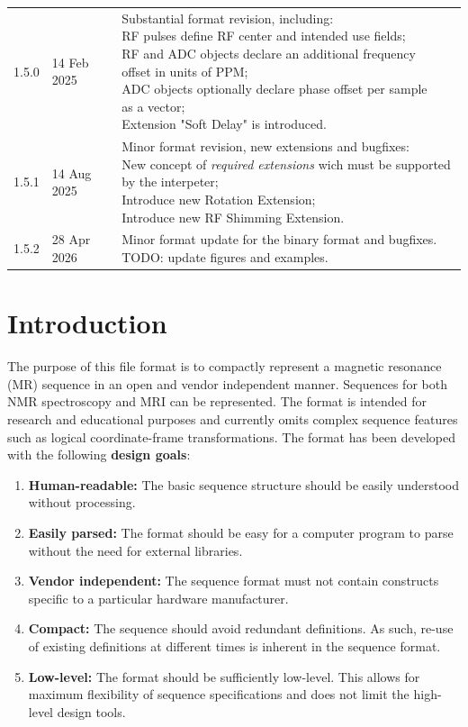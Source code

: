 \documentclass{article}
\begin{document}
\begin{tabular}{lll}
1.5.0 & 14 Feb 2025 & \makecell{Substantial format revision, including: \\
RF pulses define RF center and intended use fields; \\
RF and ADC objects declare an additional frequency \\ offset in units of PPM; \\
ADC objects optionally declare phase offset per sample \\ as a vector; \\
Extension "Soft Delay" is introduced. \\
} \\
1.5.1 & 14 Aug 2025 & \makecell{Minor format revision, new extensions and bugfixes: \\
New concept of \textit{required extensions} wich must be supported by the interpeter; \\
Introduce new Rotation Extension; \\
Introduce new RF Shimming Extension. \\
} \\ 
1.5.2 & 28 Apr 2026 & \makecell{Minor format update for the binary format and bugfixes. \\
TODO: update figures and examples.  \\
} \\ 
\bottomrule
\end{tabular}


\section{Introduction}
The purpose of this file format is to compactly represent a magnetic resonance (MR) sequence in an open and vendor independent manner. Sequences for both NMR spectroscopy and MRI can be represented. The format is intended for research and educational purposes and currently omits complex sequence features such as logical coordinate-frame transformations. The format has been developed with the following \textbf{design goals}:
\begin{enumerate}
\item \textbf{Human-readable:} The basic sequence structure should be easily understood without processing.
\item \textbf{Easily parsed:} The format should be easy for a computer program to parse without the need for external libraries.
\item \textbf{Vendor independent:} The sequence format must not contain constructs specific to a particular hardware manufacturer.
\item \textbf{Compact:} The sequence should avoid redundant definitions. As such, re-use of existing definitions at different times is inherent in the sequence format.
\item \textbf{Low-level:} The format should be sufficiently low-level. This allows for maximum flexibility of sequence specifications and does not limit the high-level design tools.
\end{enumerate}
\end{document}

